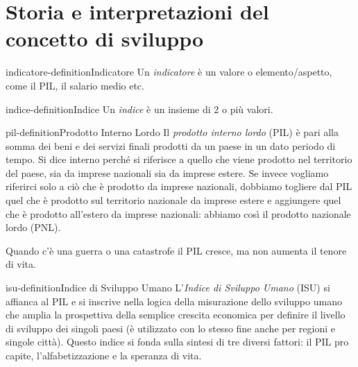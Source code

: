 \documentclass[preview]{standalone}
\begin{document}
\genpage

\section{Storia e interpretazioni del concetto di sviluppo}

\begin{snippetdefinition}{indicatore-definition}{Indicatore}
    Un \textit{indicatore} è un valore o elemento/aspetto, come il PIL, il salario medio etc.
\end{snippetdefinition}

\begin{snippetdefinition}{indice-definition}{Indice}
    Un \textit{indice} è un insieme di 2 o più valori.
\end{snippetdefinition}


\begin{snippetdefinition}{pil-definition}{Prodotto Interno Lordo}
    Il \textit{prodotto interno lordo} (PIL) è pari alla somma dei beni e dei servizi finali
    prodotti da un paese in un dato periodo di tempo. Si dice interno perché si riferisce
    a quello che viene prodotto nel territorio del paese, sia da imprese nazionali sia
    da imprese estere. Se invece vogliamo riferirci solo a ciò che è prodotto da
    imprese nazionali, dobbiamo togliere dal PIL quel che è prodotto sul territorio
    nazionale da imprese estere e aggiungere quel che è prodotto all'estero da
    imprese nazionali: abbiamo così il prodotto nazionale lordo (PNL).
\end{snippetdefinition}

\begin{plainhtml}
    Quando c'è una guerra o una catastrofe il PIL cresce, ma non aumenta il tenore di vita.
\end{plainhtml}

\begin{snippetdefinition}{isu-definition}{Indice di Sviluppo Umano}
    L'\textit{Indice di Sviluppo Umano} (ISU) si affianca al PIL e si inscrive
    nella logica della misurazione dello sviluppo umano che amplia la prospettiva
    della semplice crescita economica per definire il livello di sviluppo dei singoli
    paesi (è utilizzato con lo stesso fine anche per regioni e singole città).
    Questo indice si fonda sulla sintesi di tre diversi fattori: il PIL pro capite,
    l'alfabetizzazione e la speranza di vita.
\end{snippetdefinition}
\end{document}
